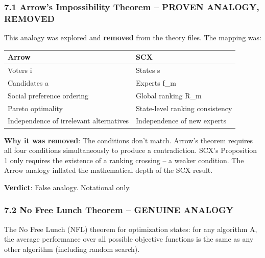 \documentclass[
  12pt,
]{article}
\begin{document}
\subsubsection{7.1 Arrow's Impossibility Theorem -- PROVEN ANALOGY,
REMOVED}\label{arrows-impossibility-theorem-proven-analogy-removed}

This analogy was explored and \textbf{removed} from the theory files.
The mapping was:

\begin{longtable}[]{@{}
  >{\raggedright\arraybackslash}p{}
  >{\raggedright\arraybackslash}p{}@{}}
\toprule\noalign{}
\begin{minipage}[b]{\linewidth}\raggedright
Arrow
\end{minipage} & \begin{minipage}[b]{\linewidth}\raggedright
SCX
\end{minipage} \\
\midrule\noalign{}
\endhead
\bottomrule\noalign{}
\endlastfoot
Voters i & States s \\
Candidates a & Experts f\_m \\
Social preference ordering & Global ranking R\_m \\
Pareto optimality & State-level ranking consistency \\
Independence of irrelevant alternatives & Independence of new experts \\
\end{longtable}

\textbf{Why it was removed}: The conditions don't match. Arrow's theorem
requires all four conditions simultaneously to produce a contradiction.
SCX's Proposition 1 only requires the existence of a ranking crossing --
a weaker condition. The Arrow analogy inflated the mathematical depth of
the SCX result.

\textbf{Verdict}: False analogy. Notational only.

\subsubsection{7.2 No Free Lunch Theorem -- GENUINE
ANALOGY}\label{no-free-lunch-theorem-genuine-analogy}

The No Free Lunch (NFL) theorem for optimization states: for any
algorithm A, the average performance over all possible objective
functions is the same as any other algorithm (including random search).
\end{document}
